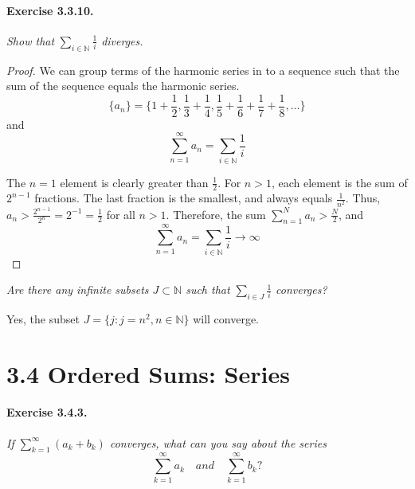 \documentclass[11pt]{article}
\newcommand{\sumto}[1]{\sum_{n=1}^{#1}}
\def \sumtoinfy {\sum_{n=1}^{\infty}}
\newcommand{\set}[1]{\{#1\}}
\begin{document}
\paragraph{Exercise 3.3.10.} \textit{Show that} $ \sum_{i \in \mathbb{N}} \frac{1}{i} $ \textit{diverges.} \newline

\begin{proof}
We can group terms of the harmonic series in to a sequence such that the sum of the sequence equals the harmonic series. $$\set{a_n} = \set{1 + \frac{1}{2}, \frac{1}{3} + \frac{1}{4}, \frac{1}{5} + \frac{1}{6} + \frac{1}{7} + \frac{1}{8}, \dots}$$ and $$\sumtoinfy a_n = \sum_{i \in \mathbb{N}} \frac{1}{i}$$

The $n=1$ element is clearly greater than $\frac{1}{2}$. For $n > 1$, each element is the sum of $2^{n-1}$ fractions. The last fraction is the smallest, and always equals $\frac{1}{n^2}$. Thus, $a_n >   \frac{2^{n-1}}{2^n} = 2^{-1} = \frac{1}{2}$ for all $n > 1$. Therefore, the sum $\sumto{N} a_n > \frac{N}{2}$, and $$\sumtoinfy a_n = \sum_{i \in \mathbb{N}} \frac{1}{i} \rightarrow \infty$$ \newline
\end{proof}

\textit{Are there any infinite subsets $J \subset \mathbb{N}$ such that} $ \sum_{i \in J} \frac{1}{i} $ \textit{converges?} \newline

Yes, the subset $J = \set{j : j = n^2, n \in \mathbb{N}}$ will converge.

\section*{3.4 Ordered Sums: Series}

\def \kinfsum{\sum_{k=1}^{\infty}}
\def \sumkton{\sum_{k=1}^{n}}

\def \aplusbsum {\sum_{k=1}^{\infty} (a_k+b_k)}
\def \asum {\sum_{k=1}^{\infty} a_k}
\def \bsum {\sum_{k=1}^{\infty} b_k}
\paragraph{Exercise 3.4.3.} \textit{If $\aplusbsum$ converges, what can you say about the series} \[ \asum \quad \textit{and} \quad \bsum ? \] \newline
\end{document}
